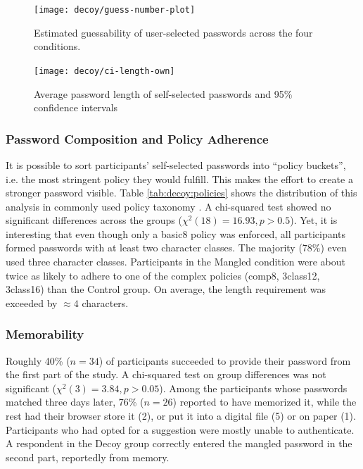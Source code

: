 \begin{figure}
	\centering
	\texttt{[image: decoy/guess-number-plot]}
	\caption{\label{fig:decoy:guess-number-plot} Estimated guessability of user-selected passwords across the four conditions.}
\end{figure}

\begin{figure}
	\centering
	\texttt{[image: decoy/ci-length-own]}
	\caption{\label{fig:decoy:ci-length-own} Average password length of self-selected passwords and 95\% confidence intervals}
\end{figure}


\subsubsection{Password Composition and Policy Adherence}
It is possible to sort participants' self-selected passwords into ``policy buckets'', i.e. the most stringent policy they would fulfill. This makes the effort to create a stronger password visible. Table \ref{tab:decoy:policies} shows the distribution of this analysis in commonly used policy taxonomy \cite{Shay2014CanLongPasswordsBeSecureAndUsable}. 
A chi-squared test showed no significant differences across the groups ($\chi^2(18)=16.93,p>0.5$). Yet, it is interesting that even though only a basic8 policy was enforced, all participants formed passwords with at least two character classes. The majority (78\%) even used three character classes. Participants in the Mangled condition were about twice as likely to adhere to one of the complex policies (comp8, 3class12, 3class16) than the Control group. On average, the length requirement was exceeded by $\approx 4$ characters. 

\subsubsection{Memorability}
Roughly 40\% ($n=34$) of participants succeeded to provide their password from the first part of the study. A chi-squared test on group differences was not significant ($\chi^2(3)=3.84,p>0.05$). Among the participants whose passwords matched three days later, 76\% ($n=26$) reported to have memorized it, while the rest had their browser store it (2), or put it into a digital file (5) or on paper (1). Participants who had opted for a suggestion were mostly unable to authenticate. A respondent in the Decoy group correctly entered the mangled password in the second part, reportedly from memory. %

